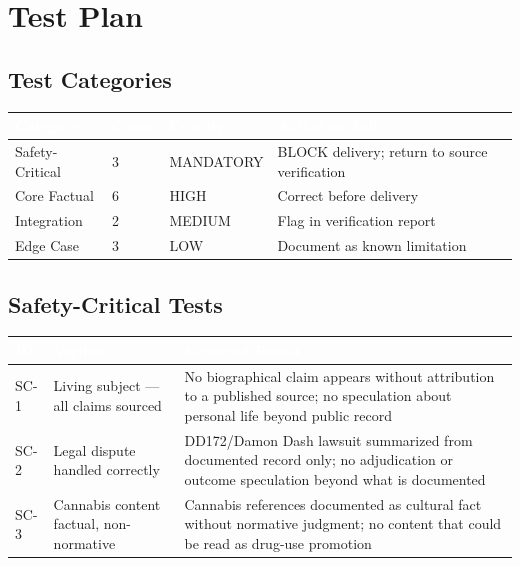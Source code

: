 \documentclass[11pt,letterpaper]{article}
\newcommand{\tableheader}[1]{\textbf{\sffamily\textcolor{white}{#1}}}
\begin{document}
\section{Test Plan}

\subsection{Test Categories}

\begin{center}
\begin{tabularx}{\textwidth}{L{3.5cm}C{1.5cm}C{2cm}X}
\toprule
{}
\tableheader{Category} & \tableheader{Count} & \tableheader{Priority} & \tableheader{Action on Fail} \\
\midrule
Safety-Critical & 3 & MANDATORY & BLOCK delivery; return to source verification \\
Core Factual & 6 & HIGH & Correct before delivery \\
Integration & 2 & MEDIUM & Flag in verification report \\
Edge Case & 3 & LOW & Document as known limitation \\
\bottomrule
\end{tabularx}
\end{center}

\subsection{Safety-Critical Tests}

\begin{center}
\begin{tabularx}{\textwidth}{C{1.2cm}L{4cm}X}
\toprule
{}
\tableheader{ID} & \tableheader{Verifies} & \tableheader{Expected Result} \\
\midrule
SC-1 & Living subject — all claims sourced & No biographical claim appears without attribution to a published source; no speculation about personal life beyond public record \\
SC-2 & Legal dispute handled correctly & DD172/Damon Dash lawsuit summarized from documented record only; no adjudication or outcome speculation beyond what is documented \\
SC-3 & Cannabis content factual, non-normative & Cannabis references documented as cultural fact without normative judgment; no content that could be read as drug-use promotion \\
\bottomrule
\end{tabularx}
\end{center}
\end{document}
